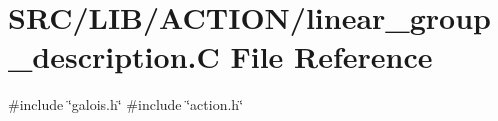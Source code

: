 \hypertarget{linear__group__description_8_c}{}\section{S\+R\+C/\+L\+I\+B/\+A\+C\+T\+I\+O\+N/linear\+\_\+group\+\_\+description.C File Reference}
\label{linear__group__description_8_c}
{\ttfamily \#include \char`\"{}galois.\+h\char`\"{}}\newline
{\ttfamily \#include \char`\"{}action.\+h\char`\"{}}\newline
